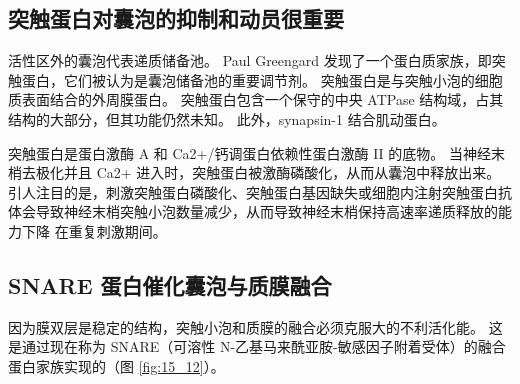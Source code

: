 \subsection{突触蛋白对囊泡的抑制和动员很重要}

活性区外的囊泡代表递质储备池。 
Paul Greengard 发现了一个蛋白质家族，即突触蛋白，它们被认为是囊泡储备池的重要调节剂。 
突触蛋白是与突触小泡的细胞质表面结合的外周膜蛋白。 突触蛋白包含一个保守的中央 ATPase 结构域，占其结构的大部分，但其功能仍然未知。 
此外，synapsin-1 结合肌动蛋白。


突触蛋白是蛋白激酶 A 和 Ca2+/钙调蛋白依赖性蛋白激酶 II 的底物。 
当神经末梢去极化并且 Ca2+ 进入时，突触蛋白被激酶磷酸化，从而从囊泡中释放出来。 
引人注目的是，刺激突触蛋白磷酸化、突触蛋白基因缺失或细胞内注射突触蛋白抗体会导致神经末梢突触小泡数量减少，从而导致神经末梢保持高速率递质释放的能力下降 在重复刺激期间。


\subsection{SNARE 蛋白催化囊泡与质膜融合}
因为膜双层是稳定的结构，突触小泡和质膜的融合必须克服大的不利活化能。 
这是通过现在称为 SNARE（可溶性 N-乙基马来酰亚胺-敏感因子附着受体）的融合蛋白家族实现的（图 \ref{fig:15_12}）。

